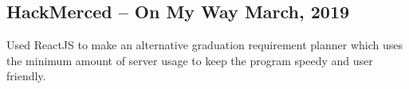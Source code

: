 \documentclass[../Resume.tex]{subfiles}
\begin{document}
	\subsection{HackMerced -- On My Way \null\hfill March, 2019}
	\par Used ReactJS to make an alternative graduation requirement planner which uses the minimum amount of server usage to keep the program speedy and user friendly.
	\vspace*{-2mm}
\end{document}
